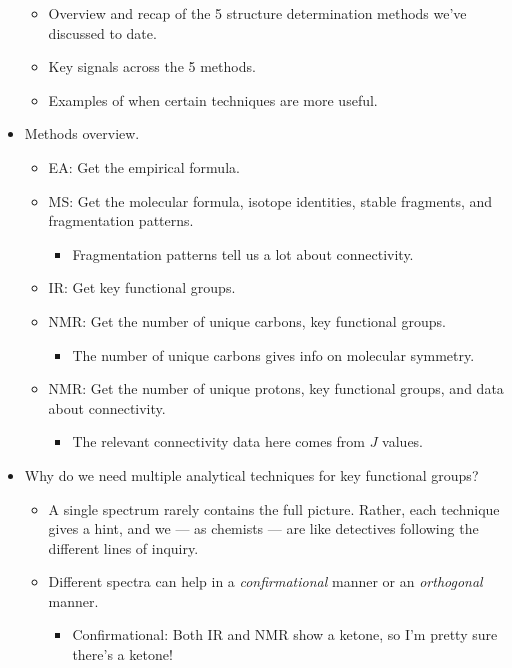 \documentclass[../notes.tex]{subfiles}
\begin{document}
\begin{itemize}
\begin{itemize}
        \item Overview and recap of the 5 structure determination methods we've discussed to date.
        \item Key signals across the 5 methods.
        \item Examples of when certain techniques are more useful.
    \end{itemize}
    \item Methods overview.
    \begin{itemize}
        \item EA: Get the empirical formula.
        \item MS: Get the molecular formula, isotope identities, stable fragments, and fragmentation patterns.
        \begin{itemize}
            \item Fragmentation patterns tell us a lot about connectivity.
        \end{itemize}
        \item IR: Get key functional groups.
        \item {} NMR: Get the number of unique carbons, key functional groups.
        \begin{itemize}
            \item The number of unique carbons gives info on molecular symmetry.
        \end{itemize}
        \item {} NMR: Get the number of unique protons, key functional groups, and data about connectivity.
        \begin{itemize}
            \item The relevant connectivity data here comes from $J$ values.
        \end{itemize}
    \end{itemize}
    \item Why do we need multiple analytical techniques for key functional groups?
    \begin{itemize}
        \item A single spectrum rarely contains the full picture. Rather, each technique gives a hint, and we --- as chemists --- are like detectives following the different lines of inquiry.
        \item Different spectra can help in a \emph{confirmational} manner or an \emph{orthogonal} manner.
        \begin{itemize}
            \item Confirmational: Both IR and  NMR show a ketone, so I'm pretty sure there's a ketone!

\end{itemize}
\end{itemize}
\end{itemize}
\end{document}

